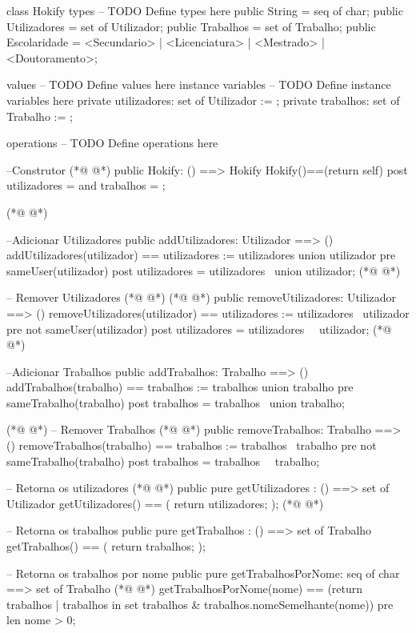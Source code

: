 \begin{vdmpp}[breaklines=true]
class Hokify
types
-- TODO Define types here
 public String = seq of char;
 public Utilizadores = set of Utilizador;
 public Trabalhos = set of Trabalho;
 public Escolaridade = <Secundario> | <Licenciatura> | <Mestrado> | <Doutoramento>;
 
values
-- TODO Define values here
instance variables
-- TODO Define instance variables here
 private utilizadores: set of Utilizador := {};
 private trabalhos: set of Trabalho := {};
 
operations
-- TODO Define operations here
 
 --Construtor
(*@
\label{Hokify:20}
@*)
 public Hokify: () ==> Hokify
 Hokify()==(return self)
 post utilizadores = {} and
   trabalhos = {};
 
(*@
\label{addUtilizadores:25}
@*)
 
 --Adicionar Utilizadores
 public addUtilizadores: Utilizador ==> ()
 addUtilizadores(utilizador) == utilizadores := utilizadores union {utilizador}
 pre sameUser(utilizador)
 post utilizadores = utilizadores~ union {utilizador};
(*@
\label{addTrabalhos:31}
@*)
 
 -- Remover Utilizadores
(*@
\label{removeUtilizadores:33}
@*)
(*@
\label{removeInteresse:33}
@*)
 public removeUtilizadores: Utilizador ==> ()
 removeUtilizadores(utilizador) == utilizadores := utilizadores \ {utilizador}
 pre not sameUser(utilizador)
 post utilizadores = utilizadores~ \ {utilizador};
(*@
\label{getUtilizadores:37}
@*)
 
 --Adicionar Trabalhos
 public addTrabalhos: Trabalho ==> ()
 addTrabalhos(trabalho) == trabalhos := trabalhos union {trabalho}
 pre sameTrabalho(trabalho)
 post trabalhos = trabalhos~ union {trabalho};
 
(*@
\label{getTrabalhos:44}
@*)
 -- Remover Trabalhos
(*@
\label{removeTrabalhos:45}
@*)
 public removeTrabalhos: Trabalho ==> ()
 removeTrabalhos(trabalho) == trabalhos := trabalhos \ {trabalho}
 pre not sameTrabalho(trabalho)
 post trabalhos = trabalhos~ \ {trabalho};
 
 -- Retorna os utilizadores
(*@
\label{getTrabalhosPorNome:51}
@*)
 public pure getUtilizadores : () ==> set of Utilizador
 getUtilizadores() ==
 (
  return utilizadores;
 );
(*@
\label{getTrabalhosPorInteresses:56}
@*)
 
 -- Retorna os trabalhos
 public pure getTrabalhos : () ==> set of Trabalho
 getTrabalhos() ==
 (
  return trabalhos;
 );
 
 -- Retorna os trabalhos por nome
 public pure getTrabalhosPorNome: seq of char ==> set of Trabalho
(*@
\label{getTrabalhosPorSkills:66}
@*)
 getTrabalhosPorNome(nome) == (return {trabalhos | trabalhos in set trabalhos & trabalhos.nomeSemelhante(nome)})
 pre len nome > 0;
 

\end{vdmpp}
